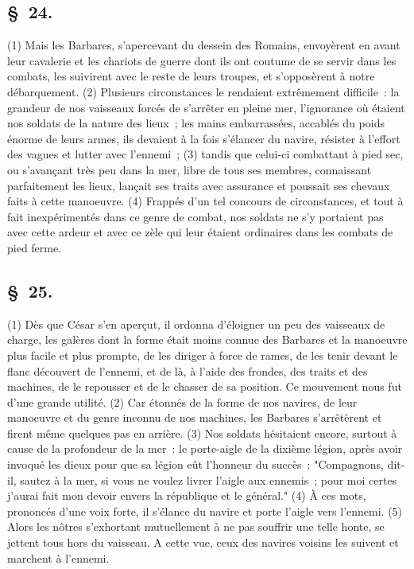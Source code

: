\documentclass[french,twoside]{book} %
\begin{document}
\subsection[{§ 24.}]{ \textsc{§ 24.} }
\noindent (1) Mais les Barbares, s’apercevant du dessein des Romains, envoyèrent en avant leur cavalerie et les chariots de guerre dont ils ont coutume de se servir dans les combats, les suivirent avec le reste de leurs troupes, et s’opposèrent à notre débarquement. (2) Plusieurs circonstances le rendaient extrêmement difficile : la grandeur de nos vaisseaux forcés de s’arrêter en pleine mer, l’ignorance où étaient nos soldats de la nature des lieux ; les mains embarrassées, accablés du poids énorme de leurs armes, ils devaient à la fois s’élancer du navire, résister à l’effort des vagues et lutter avec l’ennemi ; (3) tandis que celui-ci combattant à pied sec, ou s’avançant très peu dans la mer, libre de tous ses membres, connaissant parfaitement les lieux, lançait ses traits avec assurance et poussait ses chevaux faits à cette manoeuvre. (4) Frappés d’un tel concours de circonstances, et tout à fait inexpérimentés dans ce genre de combat, nos soldats ne s’y portaient pas avec cette ardeur et avec ce zèle qui leur étaient ordinaires dans les combats de pied ferme.
\subsection[{§ 25.}]{ \textsc{§ 25.} }
\noindent (1) Dès que César s’en aperçut, il ordonna d’éloigner un peu des vaisseaux de charge, les galères dont la forme était moins connue des Barbares et la manoeuvre plus facile et plus prompte, de les diriger à force de rames, de les tenir devant le flanc découvert de l’ennemi, et de là, à l’aide des frondes, des traits et des machines, de le repousser et de le chasser de sa position. Ce mouvement nous fut d’une grande utilité. (2) Car étonnés de la forme de nos navires, de leur manoeuvre et du genre inconnu de nos machines, les Barbares s’arrêtèrent et firent même quelques pas en arrière. (3) Nos soldats hésitaient encore, surtout à cause de la profondeur de la mer : le porte-aigle de la dixième légion, après avoir invoqué les dieux pour que sa légion eût l’honneur du succès : "Compagnons, dit-il, sautez à la mer, si vous ne voulez livrer l’aigle aux ennemis ; pour moi certes j’aurai fait mon devoir envers la république et le général." (4) À ces mots, prononcés d’une voix forte, il s’élance du navire et porte l’aigle vers l’ennemi. (5) Alors les nôtres s’exhortant mutuellement à ne pas souffrir une telle honte, se jettent tous hors du vaisseau. A cette vue, ceux des navires voisins les suivent et marchent à l’ennemi.
\end{document}
